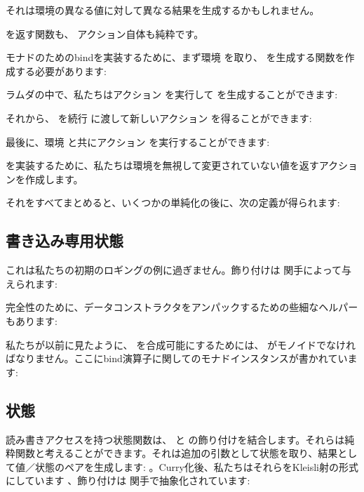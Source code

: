 それは環境の異なる値に対して異なる結果を生成するかもしれません。

 を返す関数も、 アクション自体も純粋です。

 モナドのためのbindを実装するために、まず環境  を取り、 を生成する関数を作成する必要があります: 

ラムダの中で、私たちはアクション  を実行して  を生成することができます: 

それから、 を続行  に渡して新しいアクション  を得ることができます: 

最後に、環境  と共にアクション  を実行することができます: 

 を実装するために、私たちは環境を無視して変更されていない値を返すアクションを作成します。

それをすべてまとめると、いくつかの単純化の後に、次の定義が得られます: 


\subsection{書き込み専用状態}

これは私たちの初期のロギングの例に過ぎません。飾り付けは  関手によって与えられます: 

完全性のために、データコンストラクタをアンパックするための些細なヘルパー  もあります: 

私たちが以前に見たように、 を合成可能にするためには、 がモノイドでなければなりません。ここにbind演算子に関してのモナドインスタンスが書かれています: 


\subsection{状態}

読み書きアクセスを持つ状態関数は、 と  の飾り付けを結合します。それらは純粋関数と考えることができます。それは追加の引数として状態を取り、結果として値／状態のペアを生成します: 
。Curry化後、私たちはそれらをKleisli射の形式にしています
、飾り付けは  関手で抽象化されています: 

